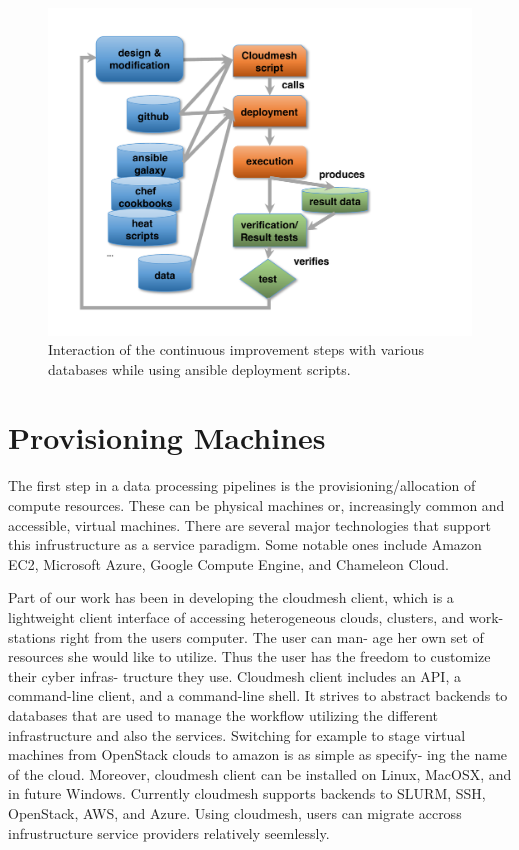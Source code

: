 \documentclass[9pt,twocolumn,twoside]{styles/osajnl}
\begin{document}
\begin{figure}
  \centering
      \includegraphics[width=0.8\columnwidth]{images/nist-devops-2.pdf}
  \caption{Interaction of the continuous improvement steps with
    various databases while using ansible deployment scripts.}
  \label{F:NIST-devops-2}
\end{figure}




\section{Provisioning Machines}



The first step in a data processing pipelines is the
provisioning/allocation of compute resources. These can be physical
machines or, increasingly common and accessible, virtual
machines. There are several major technologies that support this
infrustructure as a service paradigm. Some notable ones include Amazon
EC2, Microsoft Azure, Google Compute Engine, and Chameleon Cloud.


Part of our work has been in developing the cloudmesh client, which is
a lightweight client interface of accessing heterogeneous clouds,
clusters, and work- stations right from the users computer. The user
can man- age her own set of resources she would like to utilize. Thus
the user has the freedom to customize their cyber infras- tructure
they use. Cloudmesh client includes an API, a command-line client, and
a command-line shell. It strives to abstract backends to databases
that are used to manage the workflow utilizing the different
infrastructure and also the services. Switching for example to stage
virtual machines from OpenStack clouds to amazon is as simple as
specify- ing the name of the cloud. Moreover, cloudmesh client can be
installed on Linux, MacOSX, and in future Windows.  Currently
cloudmesh supports backends to SLURM, SSH, OpenStack, AWS, and
Azure. Using cloudmesh, users can migrate accross infrustructure
service providers relatively seemlessly.
\end{document}
